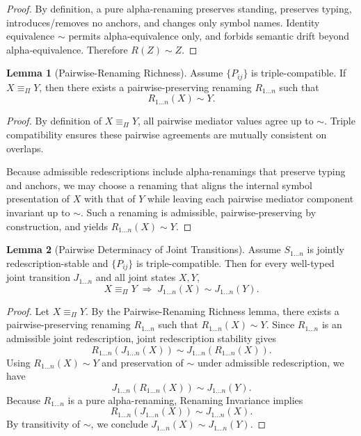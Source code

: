 \documentclass[11pt]{article}
\theoremstyle{definition}
\newtheorem{lemma}{Lemma}
\begin{document}
\begin{proof}
By definition, a pure alpha-renaming preserves standing, preserves typing, introduces/removes no anchors, and changes only symbol names.
Identity equivalence $\sim$ permits alpha-equivalence only, and forbids semantic drift beyond alpha-equivalence. Therefore $R(Z)\sim Z$.
\end{proof}

\begin{lemma}[Pairwise-Renaming Richness]
Assume $\{P_{ij}\}$ is triple-compatible.
If $X \equiv_{\Pi} Y$, then there exists a pairwise-preserving renaming $R_{1\ldots n}$ such that
\[
R_{1\ldots n}(X) \sim Y.
\]
\end{lemma}

\begin{proof}
By definition of $X \equiv_{\Pi} Y$, all pairwise mediator values agree up to $\sim$.
Triple compatibility ensures these pairwise agreements are mutually consistent on overlaps.

Because admissible redescriptions include alpha-renamings that preserve typing and anchors, we may choose a renaming
that aligns the internal symbol presentation of $X$ with that of $Y$ while leaving each pairwise mediator component invariant up to $\sim$.
Such a renaming is admissible, pairwise-preserving by construction, and yields $R_{1\ldots n}(X)\sim Y$.
\end{proof}

\begin{lemma}[Pairwise Determinacy of Joint Transitions]
Assume $S_{1\ldots n}$ is jointly redescription-stable and $\{P_{ij}\}$ is triple-compatible.
Then for every well-typed joint transition $J_{1\ldots n}$ and all joint states $X,Y$,
\[
X \equiv_{\Pi} Y \;\Rightarrow\; J_{1\ldots n}(X) \sim J_{1\ldots n}(Y).
\]
\end{lemma}

\begin{proof}
Let $X \equiv_{\Pi} Y$. By the Pairwise-Renaming Richness lemma, there exists a pairwise-preserving renaming $R_{1\ldots n}$ such that
$R_{1\ldots n}(X)\sim Y$.
Since $R_{1\ldots n}$ is an admissible joint redescription, joint redescription stability gives
\[
R_{1\ldots n}(J_{1\ldots n}(X)) \sim J_{1\ldots n}(R_{1\ldots n}(X)).
\]
Using $R_{1\ldots n}(X)\sim Y$ and preservation of $\sim$ under admissible redescription, we have
\[
J_{1\ldots n}(R_{1\ldots n}(X)) \sim J_{1\ldots n}(Y).
\]
Because $R_{1\ldots n}$ is a pure alpha-renaming, Renaming Invariance implies
\[
R_{1\ldots n}(J_{1\ldots n}(X)) \sim J_{1\ldots n}(X).
\]
By transitivity of $\sim$, we conclude $J_{1\ldots n}(X)\sim J_{1\ldots n}(Y)$.
\end{proof}
\end{document}
